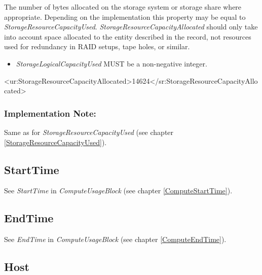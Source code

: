 The number of bytes allocated on the storage system or storage share where appropriate. Depending on the implementation this property may be equal to \emph{StorageResourceCapacityUsed}. \emph{StorageResourceCapacityAllocated} should only take into account space allocated to the entity described in the record, not resources used for redundancy in RAID setups, tape holes, or similar.

\begin{itemize}
\item \emph{StorageLogicalCapacityUsed} MUST be a non-negative integer.
\end{itemize}

\begin{XMLexample}
<ur:StorageResourceCapacityAllocated>14624</sr:StorageResourceCapacityAllocated>
\end{XMLexample}

\subsubsection*{Implementation Note:}
Same as for \emph{StorageResourceCapacityUsed} (see chapter \ref{StorageResourceCapacityUsed}).






\subsection{StartTime}

See \emph{StartTime} in \emph{ComputeUsageBlock} (see chapter \ref{ComputeStartTime}).






\subsection{EndTime}

See \emph{EndTime} in \emph{ComputeUsageBlock} (see chapter \ref{ComputeEndTime}).






\subsection{Host}

